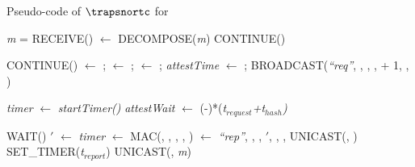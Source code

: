  \begin{algorithm}[hbt!]
\footnotesize
 \caption{Pseudo-code of $\boldsymbol{\trapsnortc}$ for \prv}\label{alg:nortc_prv}
     \begin{algorithmic}[1]
         \State \textit{m} = RECEIVE()
             \State [\snd, \hashind, \hash, \height, \netheight, \attesttime] $\gets$ DECOMPOSE(\textit{m})
             \If {$\curhashind <= \hashind$}
                 \State CONTINUE() 
             \EndIf
             
                 \State CONTINUE()
             \EndIf
             \State \parent $\gets$ \snd; \curhashind $\gets$ \hashind; \curhash $\gets$ \hash; \textit{attestTime} $\gets$ \attesttime;
             \State BROADCAST(\textit{``req''}, \devid, \curhashind, \curhash, \height + 1, \netheight, \attesttime)
        
             \State \textit{timer} $\gets$ \textit{startTimer()} 
             \State \textit{attestWait} $\gets$ (\netheight-\height)*(\textit{t$_{request}$+\textit{t$_{hash}$})}
        
                 \State WAIT()
             \EndWhile
             \state \attesttime$'$ $\gets$ \textit{timer}
             \State \Authrep $\gets$ MAC(\key, \parent, \attesttime, \hash, {\lmt})
             \State \Attrep $\gets$ \textit{``rep''}, \devid, \parent, \attesttime$'$, \hash, {\lmt}, \Authrep
             \State UNICAST(\parent, \Attrep)
             \State SET\_TIMER(\height*\textit{t$_{report}$})
         \EndIf
                     \State UNICAST(\parent, \textit{m})
                \EndIf
        \EndIf
    \EndWhile
     \end{algorithmic}
 \end{algorithm}

